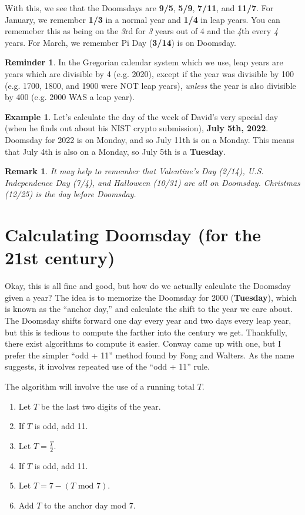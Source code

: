 \documentclass[12pt,letterpaper]{article}
\theoremstyle{plain}
\newtheorem*{remark}{Remark}
\theoremstyle{definition}
\newtheorem{example}{Example}
\newtheorem*{reminder}{Reminder}
\begin{document}
With this, we see that the Doomsdays are \textbf{9/5}, \textbf{5/9}, \textbf{7/11}, and \textbf{11/7}. For January, we remember \textbf{1/3} in a normal year and \textbf{1/4} in leap years. You can rememeber this as being on the \textit 3rd for \textit{3} years out of 4 and the \textit 4th every \textit 4 years. For March, we remember Pi Day (\textbf{3/14}) is on Doomsday. 

\begin{reminder}\label{rem:leapyear}
	In the Gregorian calendar system which we use, leap years are years which are divisible by 4 (e.g. 2020), except if the year was divisible by 100 (e.g. 1700, 1800, and 1900 were NOT leap years), \textit{unless} the year is also divisible by 400 (e.g. 2000 WAS a leap year). 
\end{reminder}

\begin{example}
	Let's calculate the day of the week of David's very special day (when he finds out about his NIST crypto submission), \textbf{July 5th, 2022}. Doomsday for 2022 is on Monday, and so July 11th is on a Monday. This means that July 4th is also on a Monday, so July 5th is a \textbf{Tuesday}.
\end{example} 

\begin{remark}
	It may help to remember that Valentine's Day (2/14), U.S. Independence Day (7/4), and Halloween (10/31) are all on Doomsday. Christmas (12/25) is the day before Doomsday. 
\end{remark}

\section{Calculating Doomsday (for the 21st century)}

Okay, this is all fine and good, but how do we actually calculate the Doomsday given a year? The idea is to memorize the Doomsday for 2000 (\textbf{Tuesday}), which is known as the ``anchor day,'' and calculate the shift to the year we care about. The Doomsday shifts forward one day every year and two days every leap year, but this is tedious to compute the farther into the century we get. Thankfully, there exist algorithms to compute it easier. Conway came up with one, but I prefer the simpler ``odd + 11'' method found by Fong and Walters. As the name suggests, it involves repeated use of the ``odd + 11'' rule. 

The algorithm will involve the use of a running total \(T\). 
\begin{enumerate}
	\item Let \(T\) be the last two digits of the year. 
	\item If \(T\) is odd, add 11. 
	\item Let \(T=\frac{T}{2}\). 
	\item If \(T\) is odd, add 11. 
	\item Let \(T=7-(T\text{ mod } 7)\). 
	\item Add \(T\) to the anchor day mod 7. 
\end{enumerate}
\end{document}
